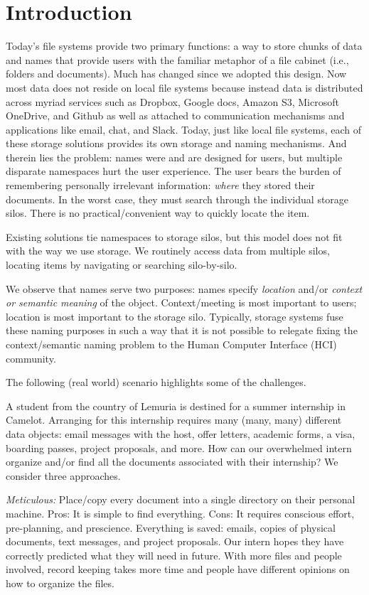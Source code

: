 \section{Introduction}\label{sec:intro}

Today's file systems provide two primary functions: a way to store chunks of data and names that provide users with the familiar
metaphor of a file cabinet (i.e., folders and documents).
Much has changed since we adopted this design. 
Now most data does not reside on local file systems because instead data is distributed across myriad services such as Dropbox, Google docs, Amazon S3, Microsoft OneDrive, and Github as well as attached to communication mechanisms and applications like email, chat, and Slack.
Today, just like local file systems, each of these storage solutions provides its own storage and naming mechanisms.
And therein lies the problem: names were and are designed for users, but multiple disparate namespaces hurt the user experience.
The user bears the burden of remembering personally irrelevant information: \textit{where} they stored their documents.
In the worst case, they must search through the individual storage silos. There is no practical/convenient way to quickly locate the item.

Existing solutions tie namespaces to storage silos, but this model does not fit with the way we use storage.  
We routinely access data from multiple silos, locating items by navigating or searching silo-by-silo.

We observe that names serve two purposes: names specify \textit{location} and/or \textit{context or semantic meaning} of the object.  
Context/meeting is most important to users; location is most important to the storage silo.
Typically, storage systems fuse these naming purposes in such a way that it is not possible to relegate
fixing the context/semantic naming problem to the Human Computer Interface (HCI) community.

The following (real world) scenario highlights some of the challenges.

A student from the country of Lemuria is destined for a summer internship in Camelot. Arranging for this internship
requires many (many, many) different data objects: email messages with the host, offer letters, academic forms, a visa, 
boarding passes, project proposals, and more. How can our overwhelmed intern organize and/or find all the documents 
associated with their internship? We consider three approaches.

\textit{Meticulous:} Place/copy every document into a single directory on their personal machine. 
Pros: It is simple to find everything. 
Cons: It requires conscious effort, pre-planning, and prescience.  Everything is saved: emails,
copies of physical documents, text messages, and project proposals. Our intern hopes they have correctly predicted what they will
need in future.  With more files and people involved, record keeping takes more time and people have different opinions on how to organize the files.


